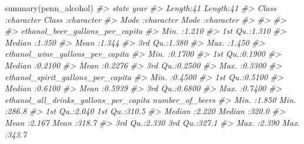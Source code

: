 \documentclass[
  12pt,
  openany]{book}
\newenvironment{Shaded}{\begin{snugshade}}{\end{snugshade}}
\newcommand{\CommentTok}[1]{\textcolor[rgb]{0.37,0.37,0.37}{\textit{#1}}}
\newcommand{\FunctionTok}[1]{\textcolor[rgb]{0,0,0}{#1}}
\newcommand{\NormalTok}[1]{#1}
\begin{document}
\begin{Shaded}
\begin{Highlighting}[]
\FunctionTok{summary}\NormalTok{(penn\_alcohol)}
\CommentTok{\#\textgreater{}     state               year          }
\CommentTok{\#\textgreater{}  Length:41          Length:41         }
\CommentTok{\#\textgreater{}  Class :character   Class :character  }
\CommentTok{\#\textgreater{}  Mode  :character   Mode  :character  }
\CommentTok{\#\textgreater{}                                       }
\CommentTok{\#\textgreater{}                                       }
\CommentTok{\#\textgreater{}                                       }
\CommentTok{\#\textgreater{}  ethanol\_beer\_gallons\_per\_capita}
\CommentTok{\#\textgreater{}  Min.   :1.210                  }
\CommentTok{\#\textgreater{}  1st Qu.:1.310                  }
\CommentTok{\#\textgreater{}  Median :1.350                  }
\CommentTok{\#\textgreater{}  Mean   :1.344                  }
\CommentTok{\#\textgreater{}  3rd Qu.:1.380                  }
\CommentTok{\#\textgreater{}  Max.   :1.450                  }
\CommentTok{\#\textgreater{}  ethanol\_wine\_gallons\_per\_capita}
\CommentTok{\#\textgreater{}  Min.   :0.1700                 }
\CommentTok{\#\textgreater{}  1st Qu.:0.1900                 }
\CommentTok{\#\textgreater{}  Median :0.2100                 }
\CommentTok{\#\textgreater{}  Mean   :0.2276                 }
\CommentTok{\#\textgreater{}  3rd Qu.:0.2500                 }
\CommentTok{\#\textgreater{}  Max.   :0.3300                 }
\CommentTok{\#\textgreater{}  ethanol\_spirit\_gallons\_per\_capita}
\CommentTok{\#\textgreater{}  Min.   :0.4500                   }
\CommentTok{\#\textgreater{}  1st Qu.:0.5100                   }
\CommentTok{\#\textgreater{}  Median :0.6100                   }
\CommentTok{\#\textgreater{}  Mean   :0.5939                   }
\CommentTok{\#\textgreater{}  3rd Qu.:0.6800                   }
\CommentTok{\#\textgreater{}  Max.   :0.7400                   }
\CommentTok{\#\textgreater{}  ethanol\_all\_drinks\_gallons\_per\_capita number\_of\_beers}
\CommentTok{\#\textgreater{}  Min.   :1.850                         Min.   :286.8  }
\CommentTok{\#\textgreater{}  1st Qu.:2.040                         1st Qu.:310.5  }
\CommentTok{\#\textgreater{}  Median :2.220                         Median :320.0  }
\CommentTok{\#\textgreater{}  Mean   :2.167                         Mean   :318.7  }
\CommentTok{\#\textgreater{}  3rd Qu.:2.330                         3rd Qu.:327.1  }
\CommentTok{\#\textgreater{}  Max.   :2.390                         Max.   :343.7  }

\end{Highlighting}
\end{Shaded}
\end{document}

